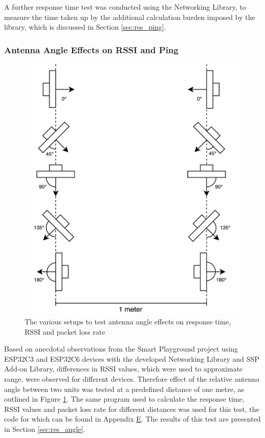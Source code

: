A further response time test was conducted using the Networking Library, to measure the time taken up by the additional calculation burden imposed by the library, which is discussed in Section \ref{sec:res_ping}.

\subsubsection{\label{sec:methods_test_angle}Antenna Angle Effects on RSSI and Ping}

\begin{figure}[H]
    \centering
    \includegraphics[width=0.5\linewidth]{overleaf/images/angletest.drawio.png}
    \vspace{\ftspace}
    \caption{The various setups to test antenna angle effects on response time, RSSI and packet loss rate}
    \label{fig:angle}
\end{figure}

Based on anecdotal observations from the Smart Playground project using ESP32C3 and ESP32C6 devices with the developed Networking Library and SSP Add-on Library, differences in RSSI values, which were used to approximate range, were observed for different devices. Therefore effect of the relative antenna angle between two units was tested at a predefined distance of one metre, as outlined in Figure \ref{fig:angle}. The same program used to calculate the response time, RSSI values and packet loss rate for different distances was used for this test, the code for which can be found in Appendix \hyperref[chap:apx_e]{E}. The results of this test are presented in Section \ref{sec:res_angle}.

